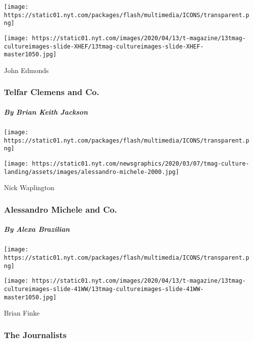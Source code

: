 \texttt{[image: https://static01.nyt.com/packages/flash/multimedia/ICONS/transparent.png]}

\texttt{[image: https://static01.nyt.com/images/2020/04/13/t-magazine/13tmag-cultureimages-slide-XHEF/13tmag-cultureimages-slide-XHEF-master1050.jpg]}

John Edmonds

\hypertarget{telfar-clemens-and-co}{%
\subsubsection{Telfar Clemens and Co.}\label{telfar-clemens-and-co}}

\hypertarget{by-brian-keith-jackson-1}{%
\subparagraph{By Brian Keith Jackson}\label{by-brian-keith-jackson-1}}

\href{https://www.nytimes.com/interactive/2020/04/13/t-magazine/maria-cornejo-olivier-rousteing-telfar-clemens-alessandro-michele.html\#alessandro-michele-and-co}{}

\texttt{[image: https://static01.nyt.com/packages/flash/multimedia/ICONS/transparent.png]}

\texttt{[image: https://static01.nyt.com/newsgraphics/2020/03/07/tmag-culture-landing/assets/images/alessandro-michele-2000.jpg]}

Nick Waplington

\hypertarget{alessandro-michele-and-co}{%
\subsubsection{Alessandro Michele and
Co.}\label{alessandro-michele-and-co}}

\hypertarget{by-alexa-brazilian}{%
\subparagraph{By Alexa Brazilian}\label{by-alexa-brazilian}}

\href{https://www.nytimes.com/interactive/2020/04/13/t-magazine/foreign-correspondents.html}{}

\texttt{[image: https://static01.nyt.com/packages/flash/multimedia/ICONS/transparent.png]}

\texttt{[image: https://static01.nyt.com/images/2020/04/13/t-magazine/13tmag-cultureimages-slide-41WW/13tmag-cultureimages-slide-41WW-master1050.jpg]}

Brian Finke

\hypertarget{the-journalists}{%
\subsubsection{The Journalists}\label{the-journalists}}


